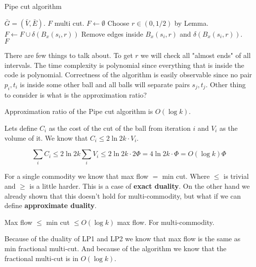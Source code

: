 \begin{algorithm}[!h]
	\caption{Pipe cut algorithm}
	\begin{algorithmic}[1]
		\Require $\bar{G} = (\bar{V}, \bar{E})$.
		\Ensure $F$ multi cut.
		\State $F \gets \emptyset$
				\State Choose $r \in (0, 1/2)$ by Lemma.
				\State $F \gets F \cup \delta(B_{x}(s_{i}, r))$
				\State Remove edges inside $B_{x}(s_{i}, r)$ and $\delta(B_{x}(s_{i}, r))$.
			\EndIf
		\EndFor \\
		\Return $F$
	\end{algorithmic}
\end{algorithm}



There are few things to talk about. To get $r$ we will check all "almost ends" of all intervals. The time complexity is polynomial since everything that is inside the code is polynomial. Correctness of the algorithm is easily observable since no pair $p_{i},t_{i}$ is inside some other ball and all balls will separate pairs $s_{j}, t_{j}$. Other thing to consider is what is the approximation ratio?

\begin{thm}
	Approximation ratio of the Pipe cut algorithm is $O(\log k)$.
\end{thm}

\begin{myproof}
	Lets define $C_{i}$ as the cost of the cut of the ball from iteration $i$ and $V_{i}$ as the volume of it. We know that $C_{i} \leq 2 \ln 2k \cdot V_{i}$.
	
	$$
	\sum_{i} C_{i} \leq 2 \ln 2k \sum_{i}V_{i} \leq 2 \ln 2k \cdot 2 \Phi = 4 \ln 2k \cdot \Phi = O (\log k) \Phi
	$$
\end{myproof}

For a single commodity we know that max flow $=$ min cut. Where $\leq$ is trivial and $\geq$ is a little harder. This is a case of \textbf{exact duality}. On the other hand we already shown that this doesn't hold for multi-commodity, but what if we can define \textbf{approximate duality}.

\begin{cor}
	Max flow $\leq$ min cut $\leq O(\log k)$ max flow. For multi-commodity.
\end{cor}

\begin{myproof}
	Because of the duality of LP1 and LP2 we know that max flow is the same as min fractional multi-cut. And because of the algorithm we know that the fractional multi-cut is in $O(\log k)$.
\end{myproof}

